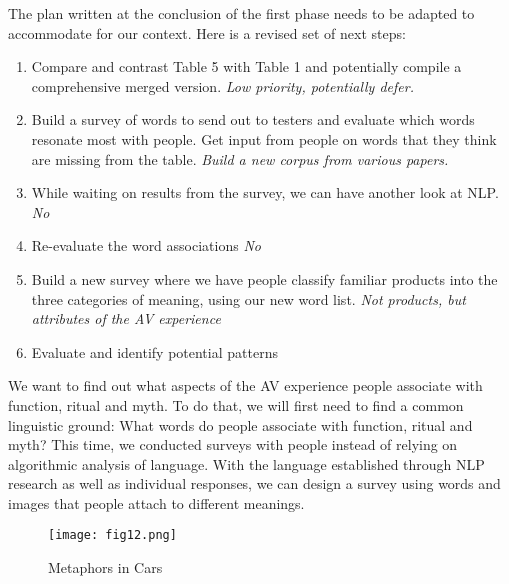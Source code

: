 \documentclass[12pt, usenames, dvipsnames]{report}
\begin{document}
\begin{flushleft}
The plan written at the conclusion of the first phase needs to be adapted to accommodate for our context.
Here is a revised set of next steps:

\begin{enumerate}
	\item Compare and contrast Table 5 with Table 1 and potentially compile a comprehensive merged version. \emph{Low priority, potentially defer.}
	\item Build a survey of words to send out to testers and evaluate which words resonate most with people. Get input from people on words that they think are missing from the table. \emph{Build a new corpus from various papers.}
	\item While waiting on results from the survey, we can have another look at NLP. \emph{No}
	\item Re-evaluate the word associations \emph{No}
	\item Build a new survey where we have people classify familiar products into the three categories of meaning, using our new word list. \emph{Not products, but attributes of the AV experience}
	\item Evaluate and identify potential patterns
\end{enumerate}

We want to find out what aspects of the AV experience people associate with function, ritual and myth. 
To do that, we will first need to find a common linguistic ground:
What words do people associate with function, ritual and myth?
This time, we conducted surveys with people instead of relying on algorithmic analysis of language. 
With the language established through NLP research as well as individual responses, we can design a survey using words and images that people attach to different meanings.


\vspace*{1.2em}
\begin{figure}[!htbp]
  \hspace*{-3.666em}
  \texttt{[image: fig12.png]}
  \caption{Metaphors in Cars}
  \label{fig:figure12}
\end{figure}
\vspace*{1.2em}


\end{flushleft}
\end{document}
